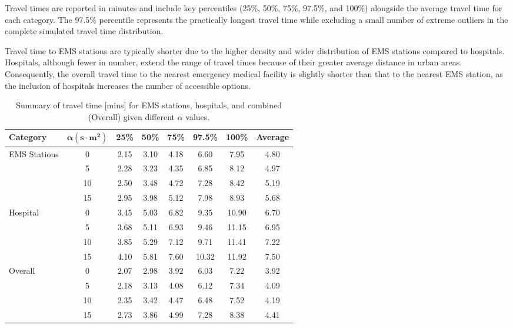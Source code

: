Travel times are reported in minutes and include key percentiles (25\%, 50\%, 75\%, 97.5\%, and 100\%) alongside the average travel time for each category. The 97.5\% percentile represents the practically longest travel time while excluding a small number of extreme outliers in the complete simulated travel time distribution. 

Travel time to EMS stations are typically shorter due to the higher density and wider distribution of EMS stations compared to hospitals. Hospitals, although fewer in number, extend the range of travel times because of their greater average distance in urban areas. Consequently, the overall travel time to the nearest emergency medical facility is slightly shorter than that to the nearest EMS station, as the inclusion of hospitals increases the number of accessible options.
\begin{table}[ht]
    \centering
    \renewcommand{\arraystretch}{1.2} 
    \setlength{\tabcolsep}{5pt} 
    \begin{tabular}{lccccccc}
        \toprule
        \textbf{Category} & \(\boldsymbol{\alpha (\text{s}\cdot\text{m}^2)}\) & \textbf{25\%} & \textbf{50\%} & \textbf{75\%} & \textbf{97.5\%} & \textbf{100\%} & \textbf{Average} \\
        \midrule
        EMS Stations & 0   & 2.15 & 3.10 & 4.18 & 6.60 & 7.95 & 4.80 \\
                     & 5   & 2.28 & 3.23 & 4.35 & 6.85 & 8.12 & 4.97 \\
                     & 10  & 2.50 & 3.48 & 4.72 & 7.28 & 8.42 & 5.19 \\
                     & 15  & 2.95 & 3.98 & 5.12 & 7.98 & 8.93 & 5.68 \\
        \midrule
        Hospital     & 0   & 3.45 & 5.03 & 6.82 & 9.35 & 10.90 & 6.70 \\
                     & 5   & 3.68 & 5.11 & 6.93 & 9.46 & 11.15 & 6.95 \\
                     & 10  & 3.85 & 5.29 & 7.12 & 9.71 & 11.41 & 7.22 \\
                     & 15  & 4.10 & 5.81 & 7.60 & 10.32 & 11.92 & 7.50 \\
        \midrule
        Overall      & 0   & 2.07 & 2.98 & 3.92 & 6.03 & 7.22 & 3.92 \\
             & 5   & 2.18 & 3.13 & 4.08 & 6.12 & 7.34 & 4.09 \\
             & 10  & 2.35 & 3.42 & 4.47 & 6.48 & 7.52 & 4.19 \\
             & 15  & 2.73 & 3.86 & 4.99 & 7.28 & 8.38 & 4.41 \\
        \bottomrule
    \end{tabular}
    \caption{Summary of travel time [mins] for EMS stations, hospitals, and combined (Overall) given different \(\alpha\) values.}
    \label{tab:travel_time_summary}
\end{table}

